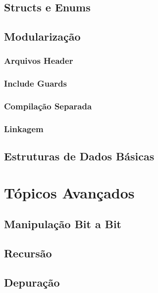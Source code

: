 \documentclass[12pt,a4paper,oneside]{extreport}
\begin{document}
\chapter{Structs e Enums}

\chapter{Modularização}

\section{Arquivos Header}

\section{Include Guards}

\section{Compilação Separada}

\section{Linkagem}

\chapter{Estruturas de Dados Básicas}




\part{Tópicos Avançados}

\chapter{Manipulação Bit a Bit}

\chapter{Recursão}

\chapter{Depuração}
\end{document}
